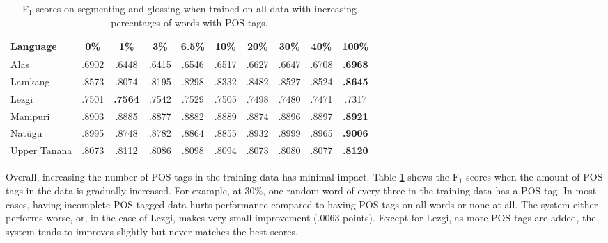 \begin{table}[!b]
    \centering
    \begin{tabular}{l|ccccccccc}
       \textbf{Language} & \textbf{0\%} & \textbf{1\%} & \textbf{3\%} & \textbf{6.5\%} & \textbf{10\%} & \textbf{20\%} & \textbf{30\%} & \textbf{40\%} & \textbf{100\%}  \\
       \hline
       Alas         & .6902 & .6448          & .6415 & .6546 & .6517 & .6627 & .6647 & .6708 & \textbf{.6968} \\
       \hline
       Lamkang      & .8573 & .8074          & .8195 & .8298 & .8332 & .8482 & .8527 & .8524 & \textbf{.8645}  \\
       \hline
       Lezgi        & .7501 & \textbf{.7564} & .7542 & .7529 & .7505 & .7498 & .7480  & .7471 & .7317 \\
       \hline
       Manipuri     & .8903 & .8885          & .8877 & .8882 & .8889 & .8874 & .8896 & .8897 & \textbf{.8921} \\
       \hline
       Nat\"ugu     & .8995 & .8748          & .8782 & .8864 & .8855 & .8932 & .8999 & .8965 & \textbf{.9006} \\
       \hline
       Upper Tanana & .8073 & .8112          & .8086 & .8098 & .8094 & .8073 & .8080 & .8077 & \textbf{.8120} \\
    \end{tabular}
    \caption[Results with More POS Tags]{F$_1$ scores on segmenting and glossing when trained on all data with increasing percentages of words with POS tags.}
    \label{tab:POSSGpsp}
\end{table}


Overall, increasing the number of POS tags in the training data has minimal impact. Table \ref{tab:POSSGpsp} shows the F$_1$-scores when the amount of POS tags in the data is gradually increased. For example, at 30\%, one random word of every three in the  training data has a POS tag. In most cases, having incomplete POS-tagged data hurts performance compared to having POS tags on all words or none at all. 
The system either performs worse, or, in the case of Lezgi, makes very small improvement (.0063 points). Except for Lezgi, as more POS tags are added, the system tends to improves slightly but never matches the best scores. 


